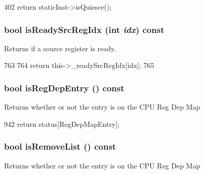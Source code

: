 \begin{DoxyCode}
402 { return staticInst->isQuiesce(); }
\end{DoxyCode}
\hypertarget{classInOrderDynInst_ad09a59cb16b4b96a42398b3bcd23cd2b}{
\subsubsection[{isReadySrcRegIdx}]{\setlength{\rightskip}{0pt plus 5cm}bool isReadySrcRegIdx (int {\em idx}) const}}
\label{classInOrderDynInst_ad09a59cb16b4b96a42398b3bcd23cd2b}
Returns if a source register is ready. 


\begin{DoxyCode}
763     {
764         return this->_readySrcRegIdx[idx];
765     }
\end{DoxyCode}
\hypertarget{classInOrderDynInst_a5eabba98d39e59f5b8a9435e70dd1c37}{
\subsubsection[{isRegDepEntry}]{\setlength{\rightskip}{0pt plus 5cm}bool isRegDepEntry () const}}
\label{classInOrderDynInst_a5eabba98d39e59f5b8a9435e70dd1c37}
Returns whether or not the entry is on the CPU Reg Dep Map 


\begin{DoxyCode}
942 { return status[RegDepMapEntry]; }
\end{DoxyCode}
\hypertarget{classInOrderDynInst_a646333640def0ac5f7aa5e9cf300bf86}{
\subsubsection[{isRemoveList}]{\setlength{\rightskip}{0pt plus 5cm}bool isRemoveList () const}}
\label{classInOrderDynInst_a646333640def0ac5f7aa5e9cf300bf86}
Returns whether or not the entry is on the CPU Reg Dep Map 


